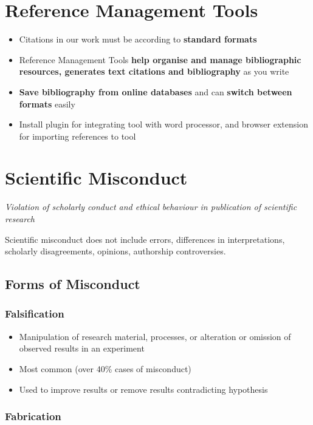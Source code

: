 \documentclass{article}
\begin{document}
\section{Reference Management Tools}

\begin{itemize}
    \item Citations in our work must be according to \textbf{standard formats}
    \item Reference Management Tools \textbf{help organise and manage bibliographic resources, generates text citations and bibliography} as you write
    \item \textbf{Save bibliography from online databases} and can \textbf{switch between formats} easily
    \item Install plugin for integrating tool with word processor, and browser extension for importing references to tool
\end{itemize}

\section{Scientific Misconduct}

\textit{Violation of scholarly conduct and ethical behaviour in publication of scientific research}

Scientific misconduct does not include errors, differences in interpretations, scholarly disagreements, opinions, authorship controversies.

\subsection{Forms of Misconduct}

\subsubsection{Falsification}

\begin{itemize}
    \item Manipulation of research material, processes, or alteration or omission of observed results in an experiment
    \item Most common (over 40\% cases of misconduct)
    \item Used to improve results or remove results contradicting hypothesis
\end{itemize}

\subsubsection{Fabrication}
\end{document}
